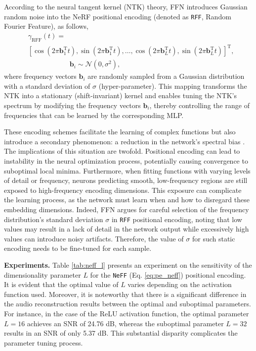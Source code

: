 \documentclass[letterpaper]{article} %
\begin{document}
According to the neural tangent kernel (NTK) theory, FFN \cite{tancik2020ffn} introduces Gaussian random noise into the NeRF positional encoding (denoted as \texttt{RFF}, Random Fourier Feature), as follows,
\begin{equation}
\label{eq:pe_rff}
\begin{aligned}
&\gamma_{\text{RFF}}({t})=\\ &\left[\cos (2 \pi \mathbf{b}_1^{\mathrm{T}} {t}), \sin (2 \pi \mathbf{b}_1^{\mathrm{T}} {t}), \ldots, \cos (2 \pi \mathbf{b}_L^{\mathrm{T}} {t}), \sin (2 \pi \mathbf{b}_L^{\mathrm{T}} {t})\right]^{\mathrm{T}}, \\
& \qquad \qquad \qquad \mathbf{b}_i \sim \mathcal{N}(0, \sigma^2),
\end{aligned}
\end{equation} where frequency vectors $\mathbf{b}_i$ are randomly sampled from a Gaussian distribution with a standard deviation of $\sigma$ (hyper-parameter). This mapping transforms the NTK into a stationary (shift-invariant) kernel and enables tuning the NTK's spectrum by modifying the frequency vectors $\mathbf{b}_i$, thereby controlling the range of frequencies that can be learned by the corresponding MLP.

These encoding schemes facilitate the learning of complex functions but also introduce a secondary phenomenon: a reduction in the network's spectral bias \cite{ramasinghe2022regularizingcoordinatemlps}. The implications of this situation are twofold. Positional encoding can lead to instability in the neural optimization process, potentially causing convergence to suboptimal local minima. Furthermore, when fitting functions with varying levels of detail or frequency, neurons predicting smooth, low-frequency regions are still exposed to high-frequency encoding dimensions. This exposure can complicate the learning process, as the network must learn when and how to disregard these embedding dimensions. Indeed, FFN \cite{tancik2020ffn} argues for careful selection of the frequency distribution's standard deviation $\sigma$ in \texttt{RFF} positional encoding, noting that low values may result in a lack of detail in the network output while excessively high values can introduce noisy artifacts. Therefore, the value of $\sigma$ for such static encoding needs to be fine-tuned for each sample.

\textbf{Experiments.}
Table \ref{tab:neff_l} presents an experiment on the sensitivity of the dimensionality parameter \( L \) for the \texttt{NeFF} (Eq. \ref{eq:pe_neff}) positional encoding. It is evident that the optimal value of \( L \) varies depending on the activation function used. Moreover, it is noteworthy that there is a significant difference in the audio reconstruction results between the optimal and suboptimal parameters. For instance, in the case of the ReLU activation function, the optimal parameter \( L=16 \) achieves an SNR of 24.76 dB, whereas the suboptimal parameter \( L=32 \) results in an SNR of only 5.37 dB. This substantial disparity complicates the parameter tuning process.
\end{document}

